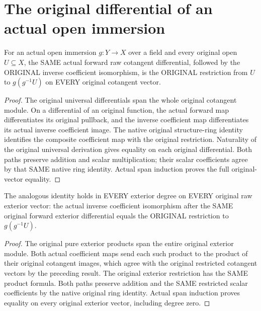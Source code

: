 \section{The original differential of an actual open immersion}

\begin{lemma}\label{sc0-open-differential:cotangent-raw}
\leanok
{}
For an actual open immersion $g:Y\to X$ over a field and every original open $U\subseteq X$, the SAME actual forward raw cotangent differential, followed by the ORIGINAL inverse coefficient isomorphism, is the ORIGINAL restriction from $U$ to $g(g^{-1}U)$ on EVERY original cotangent vector.
\end{lemma}
\begin{proof}
The original universal differentials span the whole original cotangent module. On a differential of an original function, the actual forward map differentiates its original pullback, and the inverse coefficient map differentiates its actual inverse coefficient image. The native original structure-ring identity identifies the composite coefficient map with the original restriction. Naturality of the original universal derivation gives equality on each original differential. Both paths preserve addition and scalar multiplication; their scalar coefficients agree by that SAME native ring identity. Actual span induction proves the full original-vector equality.
\end{proof}

\begin{lemma}\label{sc0-open-differential:exterior-raw}
\leanok
{}
The analogous identity holds in EVERY exterior degree on EVERY original raw exterior vector: the actual inverse coefficient isomorphism after the SAME original forward exterior differential equals the ORIGINAL restriction to $g(g^{-1}U)$.
\end{lemma}
\begin{proof}
The original pure exterior products span the entire original exterior module. Both actual coefficient maps send each such product to the product of their original cotangent images, which agree with the original restricted cotangent vectors by the preceding result. The original exterior restriction has the SAME product formula. Both paths preserve addition and the SAME restricted scalar coefficients by the native original ring identity. Actual span induction proves equality on every original exterior vector, including degree zero.
\end{proof}

